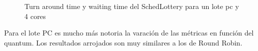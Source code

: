 \begin{figure}
\hfill
{}
\hfill
{}
\hfill
\caption{Turn around time y waiting time del SchedLottery para un lote pc y 4 cores}
\end{figure}

Para el lote PC es mucho más notoria la varación de las métricas en función del quantum. Los resultados arrojados son muy similares a los de Round Robin.

